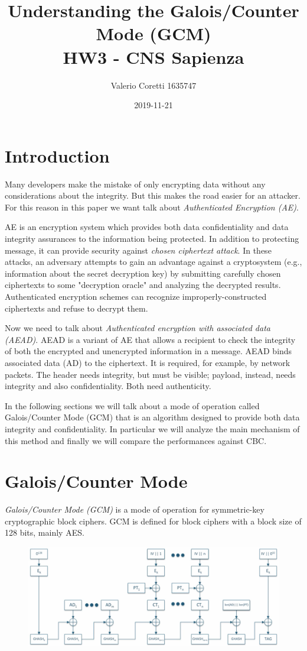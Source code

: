 \documentclass[11pt]{article}
\title{{\bf Understanding the Galois/Counter Mode (GCM)} \\ \bigskip \large HW3 - CNS Sapienza}
\date{2019-11-21}
\author{Valerio Coretti 1635747}
\begin{document}
\maketitle

\section{Introduction}
Many developers make the mistake of only encrypting data without any considerations about the integrity. But this makes the road easier for an attacker. For this reason in this paper we want talk about {\em Authenticated Encryption (AE)}.

AE is an encryption system which provides both data confidentiality and data integrity assurances to the information being protected. In addition to protecting message, it can provide security against {\em chosen ciphertext attack}. In these attacks, an adversary attempts to gain an advantage against a cryptosystem (e.g., information about the secret decryption key) by submitting carefully chosen ciphertexts to some "decryption oracle" and analyzing the decrypted results. Authenticated encryption schemes can recognize improperly-constructed ciphertexts and refuse to decrypt them.

Now we need to talk about {\em Authenticated encryption with associated data (AEAD)}.
AEAD is a variant of AE that allows a recipient to check the integrity of both the encrypted and unencrypted information in a message. AEAD binds associated data (AD) to the ciphertext. It is required, for example, by network packets. The header needs integrity, but must be visible; payload, instead, needs integrity and also confidentiality. Both need authenticity.

In the following sections we will talk about a mode of operation called Galois/Counter Mode (GCM) that is an algorithm designed to provide both data integrity and confidentiality. In particular we will analyze the main mechanism of this method and finally we will compare the performances against CBC.

\section{Galois/Counter Mode}
{\em Galois/Counter Mode (GCM)} is a mode of operation for symmetric-key cryptographic block ciphers. GCM is defined for block ciphers with a block size of 128 bits, mainly AES.

\begin{figure}[!ht]
  \includegraphics[width=1\textwidth]{pic1-hw3-1635747}
  \label{fig:GCM}
\end{figure}
\end{document}
